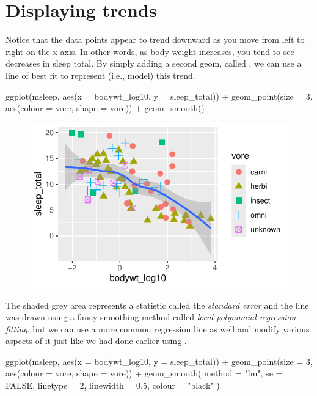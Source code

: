\section{Displaying trends}

Notice that the data points appear to trend downward as you move from left to right on the x-axis. In other words, as body weight increases, you tend to see decreases in sleep total. By simply adding a second geom, called , we can use a line of best fit to represent (i.e., model) this trend.

\begin{inR}
ggplot(msleep, aes(x = bodywt_log10, y = sleep_total)) +
    geom_point(size = 3, aes(colour = vore, shape = vore)) +
    geom_smooth()
\end{inR}
\vspace{2em}
\begin{figure}[H]
\includegraphics[scale = 0.75]{graphics/ch2Figs/ggEx_10.pdf}
\end{figure}

The shaded grey area represents a statistic called the \textit{standard error} and the line was drawn using a fancy smoothing method called \textit{local polynomial regression fitting}, but we can use a more common regression line as well and modify various aspects of it just like we had done earlier using .

\begin{inR}
ggplot(msleep, aes(x = bodywt_log10, y = sleep_total)) +
  geom_point(size = 3, aes(colour = vore, shape = vore)) +
  geom_smooth(
    method = "lm", se = FALSE,
    linetype = 2,
    linewidth = 0.5,
    colour = "black"
  )
\end{inR}

